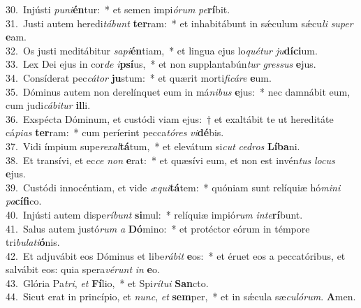 {30.~}Injústi \textit{pu}\textit{ni}\textbf{én}tur:~* et semen impi\textit{ó}\textit{rum} \textit{pe}\textbf{rí}bit.\\
{31.~}Justi autem heredi\textit{tá}\textit{bunt} \textbf{ter}ram:~* et inhabitábunt in sǽculum sǽcu\textit{li} \textit{su}\textit{per} \textbf{e}am.\\
{32.~}Os justi meditábitur \textit{sa}\textit{pi}\textbf{én}tiam,~* et lingua ejus lo\textit{qué}\textit{tur} \textit{ju}\textbf{dí}\textbf{ci}um.\\
{33.~}Lex Dei ejus in cor\textit{de} \textit{i}\textbf{psí}us,~* et non supplantabún\textit{tur} \textit{gres}\textit{sus} \textbf{e}jus.\\
{34.~}Consíderat pec\textit{cá}\textit{tor} \textbf{ju}stum:~* et quærit morti\textit{fi}\textit{cá}\textit{re} \textbf{e}um.\\
{35.~}Dóminus autem non derelínquet eum in má\textit{ni}\textit{bus} \textbf{e}jus:~* nec damnábit eum, cum judi\textit{cá}\textit{bi}\textit{tur} \textbf{il}li.\\
{36.~}Exspécta Dóminum, et custódi viam ejus:~† et exaltábit te ut hereditáte cá\textit{pi}\textit{as} \textbf{ter}ram:~* cum períerint pecca\textit{tó}\textit{res} \textit{vi}\textbf{dé}bis.\\
{37.~}Vidi ímpium supe\textit{re}\textit{xal}\textbf{tá}tum,~* et elevátum si\textit{cut} \textit{ce}\textit{dros} \textbf{Lí}\textbf{ba}ni.\\
{38.~}Et transívi, et ec\textit{ce} \textit{non} \textbf{e}rat:~* et quæsívi eum, et non est invén\textit{tus} \textit{lo}\textit{cus} \textbf{e}jus.\\
{39.~}Custódi innocéntiam, et vide \textit{æ}\textit{qui}\textbf{tá}tem:~* quóniam sunt relíquiæ hó\textit{mi}\textit{ni} \textit{pa}\textbf{cí}\textbf{fi}co.\\
{40.~}Injústi autem dispe\textit{rí}\textit{bunt} \textbf{si}mul:~* relíquiæ impió\textit{rum} \textit{in}\textit{te}\textbf{rí}bunt.\\
{41.~}Salus autem justó\textit{rum} \textit{a} \textbf{Dó}mino:~* et protéctor eórum in témpore tri\textit{bu}\textit{la}\textit{ti}\textbf{ó}nis.\\
{42.~}Et adjuvábit eos Dóminus et libe\textit{rá}\textit{bit} \textbf{e}os:~* et éruet eos a peccatóribus, et salvábit eos: quia spera\textit{vé}\textit{runt} \textit{in} \textbf{e}o.\\
{43.~}Glória Pa\textit{tri}, \textit{et} \textbf{Fí}lio,~* et Spi\textit{rí}\textit{tu}\textit{i} \textbf{San}cto.\\
{44.~}Sicut erat in princípio, et \textit{nunc}, \textit{et} \textbf{sem}per,~* et in sǽcula sæ\textit{cu}\textit{ló}\textit{rum}. \textbf{A}men.\\
